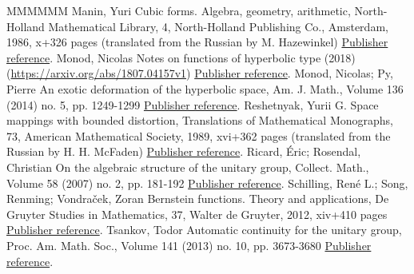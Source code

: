 \begin{thebibliography}{MMMMMM}
 Manin, Yuri Cubic forms. Algebra, geometry, arithmetic, North-Holland Mathematical Library, 4, North-Holland Publishing Co., Amsterdam, 1986, x+326 pages (translated from the Russian by M. Hazewinkel) \href{https://ahl.centre-mersenne.org/item/AHL_2019__2__259_0/#Manin}{Publisher reference}.
 Monod, Nicolas Notes on functions of hyperbolic type (2018) (\url{https://arxiv.org/abs/1807.04157v1}) \href{https://ahl.centre-mersenne.org/item/AHL_2019__2__259_0/#MonodFHT_arx}{Publisher reference}.
 Monod, Nicolas; Py, Pierre An exotic deformation of the hyperbolic space, Am. J. Math., Volume 136 (2014) no. 5, pp. 1249-1299 \href{https://ahl.centre-mersenne.org/item/AHL_2019__2__259_0/#Monod-Py}{Publisher reference}.
 Reshetnyak, Yurii G. Space mappings with bounded distortion, Translations of Mathematical Monographs, 73, American Mathematical Society, 1989, xvi+362 pages (translated from the Russian by H. H. McFaden) \href{https://ahl.centre-mersenne.org/item/AHL_2019__2__259_0/#Reshetnyak}{Publisher reference}.
 Ricard, Éric; Rosendal, Christian On the algebraic structure of the unitary group, Collect. Math., Volume 58 (2007) no. 2, pp. 181-192 \href{https://ahl.centre-mersenne.org/item/AHL_2019__2__259_0/#Ricard-Rosendal}{Publisher reference}.
 Schilling, René L.; Song, Renming; Vondraček, Zoran Bernstein functions. Theory and applications, De Gruyter Studies in Mathematics, 37, Walter de Gruyter, 2012, xiv+410 pages \href{https://ahl.centre-mersenne.org/item/AHL_2019__2__259_0/#Schilling-Song-Vondracek_2}{Publisher reference}.
 Tsankov, Todor Automatic continuity for the unitary group, Proc. Am. Math. Soc., Volume 141 (2013) no. 10, pp. 3673-3680 \href{https://ahl.centre-mersenne.org/item/AHL_2019__2__259_0/#Tsankov13}{Publisher reference}.
\end{thebibliography}

